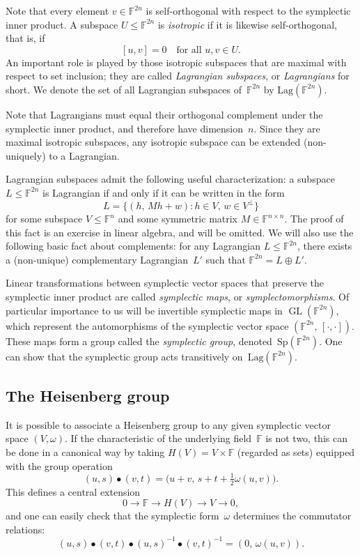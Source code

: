 \documentclass[11pt]{amsart}
\newcommand{\Lag}{\mathrm{Lag}}
\newcommand{\F}{\mathbb{F}} %
\newcommand{\Sp}{\mathrm{Sp}}
\DeclareMathOperator{\GL}{GL}
\theoremstyle{plain}
\theoremstyle{definition}
\theoremstyle{remark}
\begin{document}
Note that every element $v\in \F^{2n}$ is self-orthogonal with respect to the symplectic inner product.
A subspace $U\leq \F^{2n}$ is \emph{isotropic} if it is likewise self-orthogonal, that is, if
$$[u,v] =0 \quad \text{for all $u,v\in U$.}$$
An important role is played by those isotropic subspaces that are maximal with respect to set inclusion;
they are called \emph{Lagrangian subspaces}, or \emph{Lagrangians} for short.
We denote the set of all Lagrangian subspaces of~$\F^{2n}$ by $\Lag(\F^{2n})$.

Note that Lagrangians must equal their orthogonal complement under the symplectic inner product, and therefore have dimension~$n$.
Since they are maximal isotropic subspaces, any isotropic subspace can be extended (non-uniquely) to a Lagrangian.

Lagrangian subspaces admit the following useful characterization:
a subspace $L\leq \F^{2n}$ is Lagrangian if and only if it can be written in the form
$$L = \big\{(h,\, Mh+w) : h\in V,\, w\in V^{\perp}\big\}$$
for some subspace $V\leq \F^n$ and some symmetric matrix $M\in \F^{n\times n}$.
The proof of this fact is an exercise in linear algebra, and will be omitted.
We will also use the following basic fact about complements:
for any Lagrangian $L \leq \F^{2n}$, there exists a (non-unique) complementary Lagrangian~$L'$ such that $\F^{2n} = L \oplus L'$.

Linear transformations between symplectic vector spaces that preserve the symplectic inner product are called \emph{symplectic maps}, or \emph{symplectomorphisms}.
Of particular importance to us will be invertible symplectic maps in $\GL(\F^{2n})$, which represent the automorphisms of the symplectic vector space $(\F^{2n},\, [\cdot,\cdot])$.
These maps form a group called the \emph{symplectic group}, denoted~$\Sp(\F^{2n})$.
One can show that the symplectic group acts transitively on~$\Lag(\F^{2n})$.


\subsection{The Heisenberg group}

It is possible to associate a Heisenberg group to any given symplectic vector space $(V, \omega)$.
If the characteristic of the underlying field~$\F$ is not two, this can be done in a canonical way by taking $H(V) = V \times \F$ (regarded as sets) equipped with the group operation
\begin{equation*}
    (u,s) \bullet (v,t) = \big(u+v,\, s+t+\tfrac{1}{2}\omega(u,v)\big).
\end{equation*}
This defines a central extension
$$0 \rightarrow \F \rightarrow H(V) \rightarrow V \rightarrow 0,$$
and one can easily check that the symplectic form~$\omega$ determines the commutator relations:
$$(u,s) \bullet (v,t) \bullet (u,s)^{-1} \bullet (v,t)^{-1} = (0,\, \omega(u,v)).$$
\end{document}
